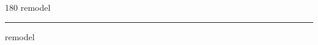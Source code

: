 
\begin{frame}
\begin{center}
\begin{turn}{180}
{\fontsize{2.5cm}{1em}\selectfont remodel}
\end{turn}
\vspace{1em}\par  
\hrule
\vspace{1em}\par  
{\fontsize{2.5cm}{1em}\selectfont remodel}
\end{center}
\end{frame}
